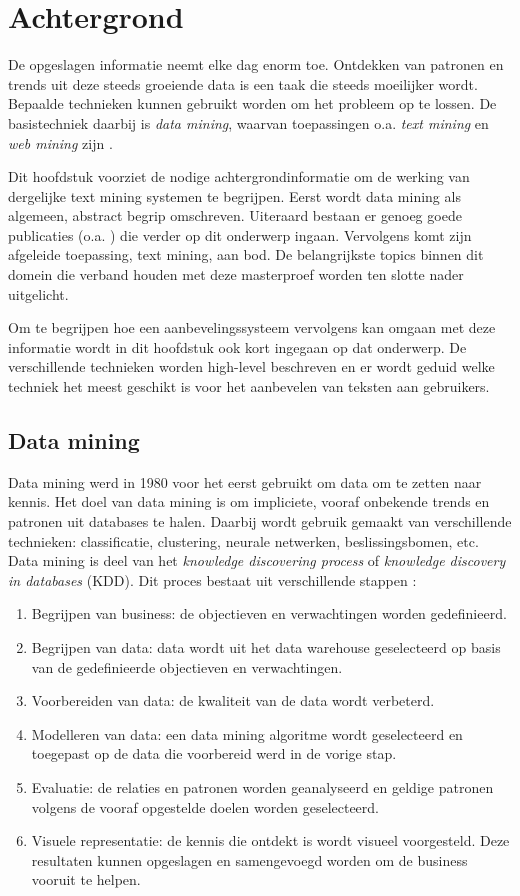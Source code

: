 \chapter{Achtergrond}\label{hs:achtergrond}

De opgeslagen informatie neemt elke dag enorm toe. Ontdekken van patronen en trends uit deze steeds groeiende data is een taak die steeds moeilijker wordt. Bepaalde technieken kunnen gebruikt worden om het probleem op te lossen. De basistechniek daarbij is \textit{data mining}, waarvan toepassingen o.a. \textit{text mining} en \textit{web mining} zijn \cite{Nasa2012}. 

Dit hoofdstuk voorziet de nodige achtergrondinformatie om de werking van dergelijke text mining systemen te begrijpen. Eerst wordt data mining als algemeen, abstract begrip omschreven. Uiteraard bestaan er genoeg goede publicaties (o.a. \cite{Han2012}) die verder op dit onderwerp ingaan. Vervolgens komt zijn afgeleide toepassing, text mining, aan bod. De belangrijkste topics binnen dit domein die verband houden met deze masterproef worden ten slotte nader uitgelicht. 

Om te begrijpen hoe een aanbevelingssysteem vervolgens kan omgaan met deze informatie wordt in dit hoofdstuk ook kort ingegaan op dat onderwerp. De verschillende technieken worden high-level beschreven en er wordt geduid welke techniek het meest geschikt is voor het aanbevelen van teksten aan gebruikers. 

\section{Data mining}\label{data-mining}
Data mining werd in 1980 voor het eerst gebruikt om data om te zetten naar kennis. Het doel van data mining is om impliciete, vooraf onbekende trends en patronen uit databases te halen. Daarbij wordt gebruik gemaakt van verschillende technieken: classificatie, clustering, neurale netwerken, beslissingsbomen, etc. 
\\Data mining is deel van het \textit{knowledge discovering process} of \textit{knowledge discovery in databases} (KDD). Dit proces bestaat uit verschillende stappen \cite{Fayyad1996}:
\begin{enumerate}
	\item Begrijpen van business: de objectieven en verwachtingen worden gedefinieerd.
	\item Begrijpen van data: data wordt uit het data warehouse geselecteerd op basis van de gedefinieerde objectieven en verwachtingen.
	\item Voorbereiden van data: de kwaliteit van de data wordt verbeterd.
	\item Modelleren van data: een data mining algoritme wordt geselecteerd en toegepast op de data die voorbereid werd in de vorige stap.
	\item Evaluatie: de relaties en patronen worden geanalyseerd en geldige patronen volgens de vooraf opgestelde doelen worden geselecteerd.
	\item Visuele representatie: de kennis die ontdekt is wordt visueel voorgesteld. Deze resultaten kunnen opgeslagen en samengevoegd worden om de business vooruit te helpen.
\end{enumerate}

